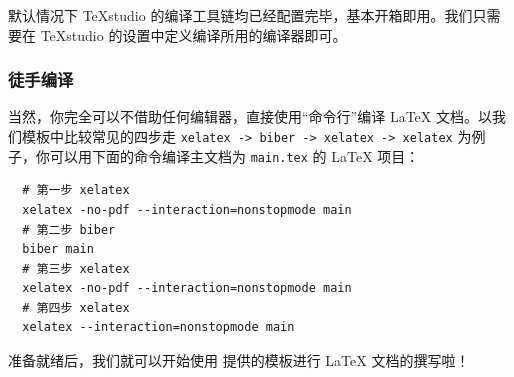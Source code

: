 默认情况下 \TeX studio 的编译工具链均已经配置完毕，基本开箱即用。我们只需要在 \TeX studio 的设置中定义编译所用的编译器即可。

\subsubsection{徒手编译}

当然，你完全可以不借助任何编辑器，直接使用“命令行”编译 {\LaTeX} 文档。以我们模板中比较常见的四步走 \texttt{xelatex -> biber -> xelatex -> xelatex} 为例子，你可以用下面的命令编译主文档为 \texttt{main.tex} 的 {\LaTeX} 项目：

\begin{verbatim}
  # 第一步 xelatex
  xelatex -no-pdf --interaction=nonstopmode main
  # 第二步 biber
  biber main
  # 第三步 xelatex
  xelatex -no-pdf --interaction=nonstopmode main
  # 第四步 xelatex
  xelatex --interaction=nonstopmode main
\end{verbatim}


准备就绪后，我们就可以开始使用 {\BIThesis} 提供的模板进行 {\LaTeX} 文档的撰写啦！
